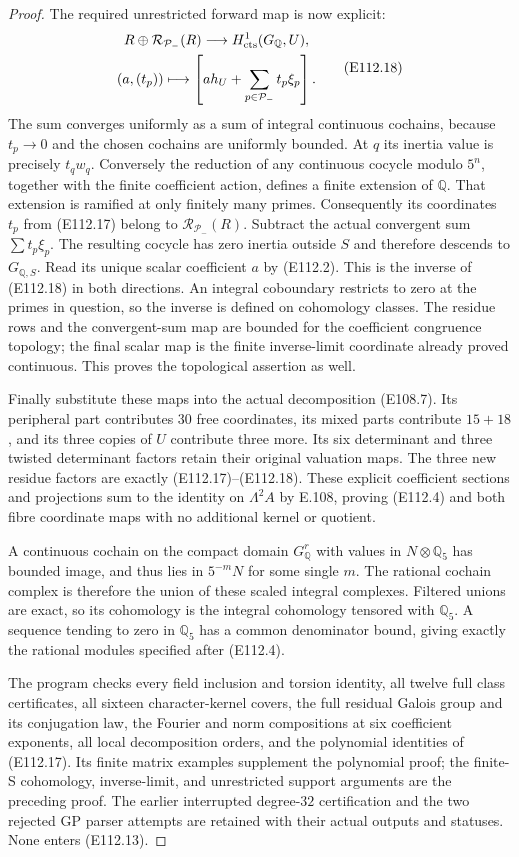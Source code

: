 \begin{proof}
The required unrestricted forward map is now explicit:
\[
 \begin{gathered}
 R\oplus\mathcal R_{\mathcal P_-}(R)
       \longrightarrow H^1_{\rm cts}(G_{\mathbb Q},U),\\
 (a,(t_p))\longmapsto
       \left[a h_U+\sum_{p\in\mathcal P_-}t_p\xi_p\right].
 \end{gathered}
 \tag{E112.18}
\]
The sum converges uniformly as a sum of integral continuous
cochains, because $t_p\to0$ and the chosen cochains are
uniformly bounded.  At $q$ its inertia value is precisely
$t_qw_q$.
Conversely the reduction of any continuous cocycle modulo
$5^n$, together with the finite coefficient action, defines
a finite extension of $\mathbb Q$.  That extension is
ramified at only finitely many primes.  Consequently its
coordinates $t_p$ from (E112.17) belong to
$\mathcal R_{\mathcal P_-}(R)$.
Subtract the actual convergent sum $\sum t_p\xi_p$.
The resulting cocycle has zero inertia outside $S$ and
therefore descends to $G_{\mathbb Q,S}$.
Read its unique scalar coefficient $a$ by (E112.2).
This is the inverse of (E112.18) in both directions.
An integral coboundary restricts to zero at the primes in
question, so the inverse is defined on cohomology classes.
The residue rows and the convergent-sum map are bounded
for the coefficient congruence topology; the final scalar
map is the finite inverse-limit coordinate already proved
continuous.  This proves the topological assertion as well.

Finally substitute these maps into the actual decomposition
(E108.7).  Its peripheral part contributes $30$ free
coordinates, its mixed parts contribute $15+18$, and its
three copies of $U$ contribute three more.  Its six
determinant and three twisted determinant factors retain
their original valuation maps.  The three new residue
factors are exactly (E112.17)--(E112.18).  These explicit
coefficient sections and projections sum to the identity
on $\Lambda^2A$ by E.108, proving (E112.4) and both fibre
coordinate maps with no additional kernel or quotient.

A continuous cochain on the compact domain
$G_{\mathbb Q}^r$ with values in $N\otimes\mathbb Q_5$
has bounded image, and thus lies in $5^{-m}N$ for some
single $m$.  The rational cochain complex is therefore
the union of these scaled integral complexes.
Filtered unions are exact, so its cohomology is the
integral cohomology tensored with $\mathbb Q_5$.
A sequence tending to zero in $\mathbb Q_5$ has a common
denominator bound, giving exactly the rational modules
specified after (E112.4).

The program checks every field inclusion and torsion
identity, all twelve full class certificates, all sixteen
character-kernel covers, the full residual Galois group
and its conjugation law, the Fourier and norm compositions
at six coefficient exponents, all local decomposition
orders, and the polynomial identities of (E112.17).
Its finite matrix examples supplement the polynomial
proof; the finite-S cohomology, inverse-limit, and
unrestricted support arguments are the preceding proof.
The earlier interrupted degree-$32$ certification and
the two rejected GP parser attempts are retained with
their actual outputs and statuses.  None enters (E112.13).
\end{proof}
